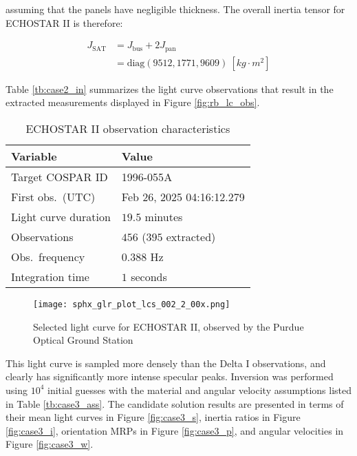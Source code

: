 \documentclass[a4paper,twocolumn]{spaceDebrisC} %
\newcommand{\figbig}[0]{0.5\textwidth}
\begin{document}
\noindent
assuming that the panels have negligible thickness. The overall inertia tensor for ECHOSTAR II is therefore:

\begin{align}
 J_\text{SAT} &= J_\text{bus} + 2J_\text{pan} \\
  &= \text{diag} \left( 9512, 1771, 9609 \right) \: [kg \cdot m^2]
\end{align}

Table \ref{tb:case2_in} summarizes the light curve observations that result in the extracted measurements displayed in Figure \ref{fig:rb_lc_obs}.

\begin{table}[H]
  \centering
  \caption{ECHOSTAR II observation characteristics}
  \vspace*{6pt}
  \begin{tabular}{|l|l|}
  \hline
  \textbf{Variable} & \textbf{Value} \\ \hline
 Target COSPAR ID & 1996-055A \\ \hline
 First obs.\ (UTC) & Feb 26, 2025 04:16:12.279 \\ \hline
 Light curve duration & $19.5$ minutes \\ \hline
 Observations & $456$ ($395$ extracted) \\ \hline
 Obs.\ frequency & $0.388$ Hz \\ \hline
 Integration time & $1$ seconds \\ \hline
  \end{tabular}
  \label{tb:case3_in}
\end{table}

\begin{figure}[H]
  \centering
  \texttt{[image: sphx\_glr\_plot\_lcs\_002\_2\_00x.png]}
  \caption{Selected light curve for ECHOSTAR II, observed by the Purdue Optical Ground Station}
  \label{fig:sat_lc_obs}
\end{figure}

This light curve is sampled more densely than the Delta I observations, and clearly has significantly more intense specular peaks. Inversion was performed using $10^4$ initial guesses with the material and angular velocity assumptions listed in Table \ref{tb:case3_ass}. The candidate solution results are presented in terms of their mean light curves in Figure \ref{fig:case3_s}, inertia ratios in Figure \ref{fig:case3_i}, orientation MRPs in Figure \ref{fig:case3_p}, and angular velocities in Figure \ref{fig:case3_w}.
\end{document}
